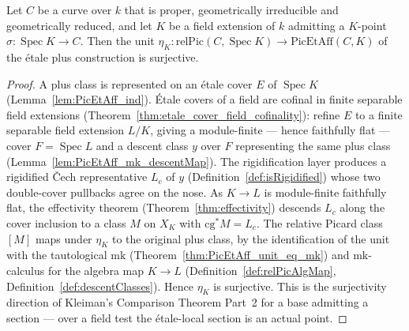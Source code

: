 \begin{theorem}
  \label{thm:unit_surjective_of_section}
  \leanok
  Let \(C\) be a curve over \(k\) that is proper, geometrically irreducible and geometrically
  reduced, and let \(K\) be a field extension of \(k\) admitting a \(K\)-point \(\sigma \colon
  \operatorname{Spec} K \to C\). Then the unit \(\eta_K \colon \mathrm{relPic}(C, \operatorname{Spec}
  K) \to \mathrm{PicEtAff}(C, K)\) of the \'etale plus construction is surjective.
\end{theorem}
\begin{proof}
  \leanok
  A plus class is represented on an \'etale cover \(E\) of \(\operatorname{Spec} K\)
  (Lemma~\ref{lem:PicEtAff_ind}). \'Etale covers of a field are cofinal in finite separable field
  extensions (Theorem~\ref{thm:etale_cover_field_cofinality}): refine \(E\) to a finite separable
  field extension \(L/K\), giving a module-finite --- hence faithfully flat --- cover \(F =
  \operatorname{Spec} L\) and a descent class \(y\) over \(F\) representing the same plus class
  (Lemma~\ref{lem:PicEtAff_mk_descentMap}). The rigidification layer produces a rigidified \v Cech
  representative \(L_c\) of \(y\) (Definition~\ref{def:isRigidified}) whose two double-cover pullbacks
  agree on the nose. As \(K \to L\) is module-finite faithfully flat, the effectivity theorem
  (Theorem~\ref{thm:effectivity}) descends \(L_c\) along the cover inclusion to a class \(M\) on
  \(X_K\) with \(\mathrm{cg}^{*}M = L_c\). The relative Picard class \([M]\) maps under \(\eta_K\) to
  the original plus class, by the identification of the unit with the tautological \(\mathrm{mk}\)
  (Theorem~\ref{thm:PicEtAff_unit_eq_mk}) and \(\mathrm{mk}\)-calculus for the algebra map \(K \to L\)
  (Definition~\ref{def:relPicAlgMap}, Definition~\ref{def:descentClasses}). Hence \(\eta_K\) is
  surjective. This is the surjectivity direction of Kleiman's Comparison Theorem Part~2 for a base
  admitting a section --- over a field test the \'etale-local section is an actual point.
\end{proof}

